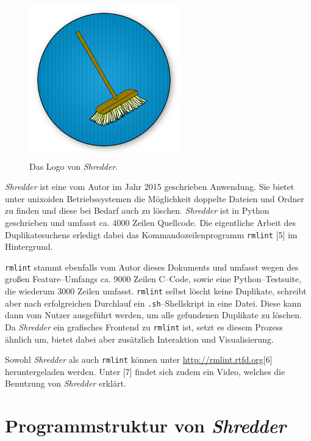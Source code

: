 \documentclass[11pt,ngerman,toc=listof,index=totoc]{scrreprt}
\begin{document}
\begin{figure}[htbp]
\centering
\includegraphics{docs/pics/shredder_logo.png}
\caption{Das Logo von \emph{Shredder}.}
\end{figure}

\emph{Shredder} ist eine vom Autor im Jahr 2015 geschrieben Anwendung.
Sie bietet unter unixoiden Betriebssystemen die Möglichkeit doppelte
Dateien und Ordner zu finden und diese bei Bedarf auch zu löschen.
\emph{Shredder} ist in Python geschrieben und umfasst ca. 4000 Zeilen
Quellcode. Die eigentliche Arbeit des Duplikatesuchens erledigt dabei
das Kommandozeilenprogramm \texttt{rmlint} {[}5{]} im Hintergrund.

\texttt{rmlint} stammt ebenfalls vom Autor dieses Dokuments und umfasst
wegen des großen Feature--Umfangs ca. 9000 Zeilen C--Code, sowie eine
Python--Testsuite, die wiederum 3000 Zeilen umfasst. \texttt{rmlint}
selbst löscht keine Duplikate, schreibt aber nach erfolgreichen
Durchlauf ein \texttt{.sh}--Shellskript in eine Datei. Diese kann dann
vom Nutzer ausgeführt werden, um alle gefundenen Duplikate zu löschen.
Da \emph{Shredder} ein grafisches Frontend zu \texttt{rmlint} ist, setzt
es diesem Prozess ähnlich um, bietet dabei aber zusätzlich Interaktion
und Visualisierung.

Sowohl \emph{Shredder} als auch \texttt{rmlint} können unter
\url{http://rmlint.rtfd.org}{[}6{]} heruntergeladen werden. Unter
{[}7{]} findet sich zudem ein Video, welches die Benutzung von
\emph{Shredder} erklärt.

\section{\texorpdfstring{Programmstruktur von
\emph{Shredder}}{Programmstruktur von Shredder}}\label{programmstruktur-von-shredder}
\end{document}
